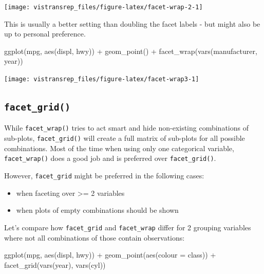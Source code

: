 \documentclass[]{book}
\newenvironment{Shaded}{}{}
\newcommand{\DataTypeTok}[1]{#1}
\newcommand{\KeywordTok}[1]{\textcolor[rgb]{0.00,0.00,1.00}{#1}}
\newcommand{\NormalTok}[1]{#1}
\newcommand{\OperatorTok}[1]{#1}
\newcommand{\StringTok}[1]{\textcolor[rgb]{0.00,0.50,0.50}{#1}}
\begin{document}
\begin{flushright}\texttt{[image: vistransrep\_files/figure-latex/facet-wrap-2-1]} \end{flushright}

This is usually a better setting than doubling the facet labels - but might also be up to personal preference.

\begin{Shaded}
\begin{Highlighting}[]
\KeywordTok{ggplot}\NormalTok{(mpg, }\KeywordTok{aes}\NormalTok{(displ, hwy)) }\OperatorTok{+}
\StringTok{  }\KeywordTok{geom_point}\NormalTok{() }\OperatorTok{+}
\StringTok{  }\KeywordTok{facet_wrap}\NormalTok{(}\KeywordTok{vars}\NormalTok{(manufacturer, year))}
\end{Highlighting}
\end{Shaded}

\begin{flushright}\texttt{[image: vistransrep\_files/figure-latex/facet-wrap3-1]} \end{flushright}

\hypertarget{facet_grid}{%
\subsection{\texorpdfstring{\texttt{facet\_grid()}}{facet\_grid()}}\label{facet_grid}}

While \texttt{facet\_wrap()} tries to act smart and hide non-existing combinations of sub-plots, \texttt{facet\_grid()} will create a full matrix of sub-plots for all possible combinations.
Most of the time when using only one categorical variable, \texttt{facet\_wrap()} does a good job and is preferred over \texttt{facet\_grid()}.

However, \texttt{facet\_grid} might be preferred in the following cases:

\begin{itemize}
\item
  when faceting over \textgreater{}= 2 variables
\item
  when plots of empty combinations should be shown
\end{itemize}

Let's compare how \texttt{facet\_grid} and \texttt{facet\_wrap} differ for 2 grouping variables where not all combinations of those contain observations:

\begin{Shaded}
\begin{Highlighting}[]
\KeywordTok{ggplot}\NormalTok{(mpg, }\KeywordTok{aes}\NormalTok{(displ, hwy)) }\OperatorTok{+}
\StringTok{  }\KeywordTok{geom_point}\NormalTok{(}\KeywordTok{aes}\NormalTok{(}\DataTypeTok{colour =}\NormalTok{ class)) }\OperatorTok{+}
\StringTok{  }\KeywordTok{facet_grid}\NormalTok{(}\KeywordTok{vars}\NormalTok{(year), }\KeywordTok{vars}\NormalTok{(cyl))}
\end{Highlighting}
\end{Shaded}
\end{document}
